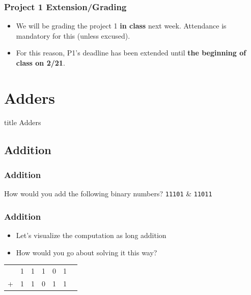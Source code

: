 \documentclass{beamer}
\begin{document}
            \begin{frame}
                \frametitle{Project 1 Extension/Grading}
                \begin{itemize}
                    \item We will be grading the project 1 \textbf{in class} next week. Attendance is mandatory for this (unless excused).
                    \item For this reason, P1's deadline has been extended until \textbf{the beginning of class on 2/21}.
                    
                \end{itemize}
            \end{frame}
            
        
    \section{Adders}
    
    	\begin{frame}
                \vfill
                \centering
                \begin{beamercolorbox}[sep=8pt,center,shadow=true,rounded=true]{title}
                    Adders\par%
                \end{beamercolorbox}
                \vfill
             \end{frame}
    
    	\subsection{Addition}
    
    	\begin{frame}
    		\frametitle{Addition}
    		\begin{center}
    			{\Large How would you add the following binary numbers?}
    			\linebreak
    			{\Large \texttt{11101} \& \texttt{11011}}
    		\end{center}
    	\end{frame}
    	
    	\begin{frame}
    		\frametitle{Addition}
    		\begin{itemize}
    			\item Let's visualize the computation as long addition
    			\item How would you go about solving it this way?
			\end{itemize}
			
			\centering
			{\LARGE
			\begin{tabular}{c@{\,}c@{\,}c@{\,}c@{\,}c@{\,}c@{\,}c}
					   & 1 & 1 & 1 & 0 & 1 \\
					 + & 1 & 1 & 0 & 1 & 1 \\
					\hline
					
			\end{tabular}}
		\end{frame}
		
\end{document}
